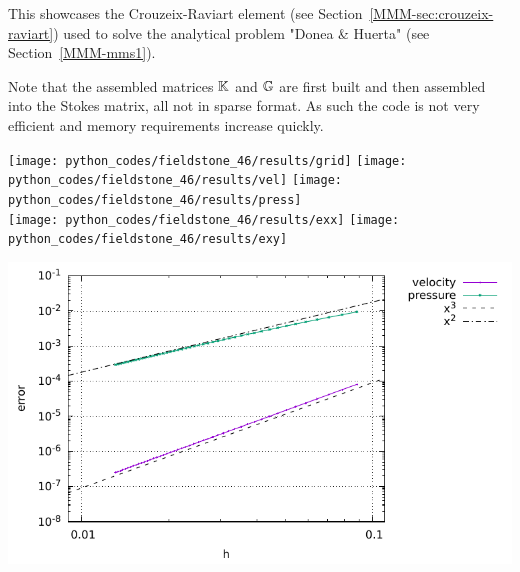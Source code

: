 This \stone showcases the Crouzeix-Raviart element (see Section~\ref{MMM-sec:crouzeix-raviart})
used to solve the analytical problem "Donea \& Huerta" (see Section~\ref{MMM-mms1}).

Note that the assembled matrices ${\mathbb{K}}$ and ${\mathbb{G}}$ are first built and then assembled
into the Stokes matrix, all not in sparse format. As such the code is not very efficient 
and memory requirements increase quickly. 

\begin{center}
\texttt{[image: python\_codes/fieldstone\_46/results/grid]}
\texttt{[image: python\_codes/fieldstone\_46/results/vel]}
\texttt{[image: python\_codes/fieldstone\_46/results/press]}\\
\texttt{[image: python\_codes/fieldstone\_46/results/exx]}
\texttt{[image: python\_codes/fieldstone\_46/results/exy]}
\end{center}

\begin{center}
\includegraphics[width=14cm]{python_codes/fieldstone_46/results/errors.pdf}
\end{center}

